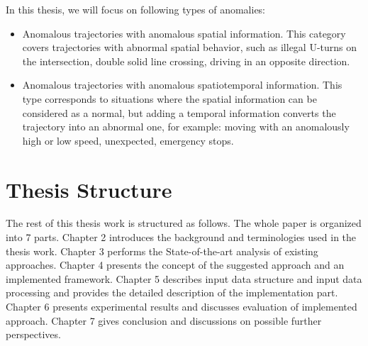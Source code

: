 In this thesis, we will focus on following types of anomalies:
\begin{itemize}
	\item Anomalous trajectories with anomalous spatial information. This category covers trajectories with abnormal spatial behavior, such as illegal U-turns on the intersection, double solid line crossing, driving in an opposite direction.
	\item Anomalous trajectories with anomalous spatiotemporal information. This type corresponds to situations where the spatial information can be considered as a normal, but adding a temporal information converts the trajectory into an abnormal one, for example: moving with an anomalously high or low speed, unexpected, emergency stops.
\end{itemize}

\section{Thesis Structure}

The rest of this thesis work is structured as follows. The whole paper is organized into 7 parts. Chapter 2 introduces the background and terminologies used in the thesis work. Chapter 3 performs the State-of-the-art analysis of existing approaches. Chapter 4 presents the concept of the suggested approach and an implemented framework. Chapter 5 describes input data structure and input data processing and provides the detailed description of the implementation part. Chapter 6 presents experimental results and discusses evaluation of implemented approach. Chapter 7 gives conclusion and discussions on possible further perspectives.